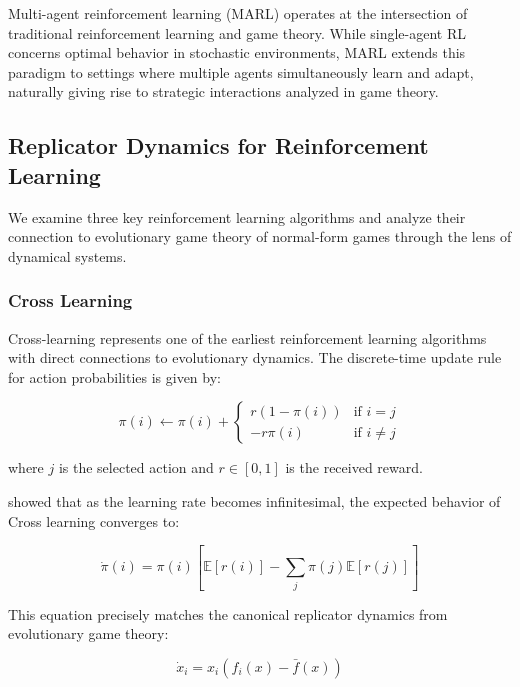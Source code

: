 Multi-agent reinforcement learning (MARL) operates at the intersection of traditional reinforcement learning and game theory. While single-agent RL concerns optimal behavior in stochastic environments, MARL extends this paradigm to settings where multiple agents simultaneously learn and adapt, naturally giving rise to strategic interactions analyzed in game theory. 

\subsection{Replicator Dynamics for Reinforcement Learning}

We examine three key reinforcement learning algorithms and analyze their connection to evolutionary game theory of normal-form games through the lens of dynamical systems.

\subsubsection{Cross Learning}

Cross-learning \citep{Cross1973} represents one of the earliest reinforcement learning algorithms with direct connections to evolutionary dynamics. The discrete-time update rule for action probabilities is given by:

\begin{equation}
\pi(i) \leftarrow \pi(i) + 
\begin{cases} 
r(1 - \pi(i)) & \text{if } i = j \\ 
-r\pi(i) & \text{if } i \neq j 
\end{cases}
\end{equation}

\noindent where $j$ is the selected action and $r \in [0,1]$ is the received reward.

\citet{borgers1997learning} showed that as the learning rate becomes infinitesimal, the expected behavior of Cross learning converges to:

\begin{equation}
\dot{\pi}(i) = \pi(i)\left[\mathbb{E}[r(i)] - \sum_j \pi(j)\mathbb{E}[r(j)]\right]
\end{equation}

This equation precisely matches the canonical replicator dynamics from evolutionary game theory:

\begin{equation}
\dot{x}_i = x_i(f_i(x) - \bar{f}(x))
\end{equation}

